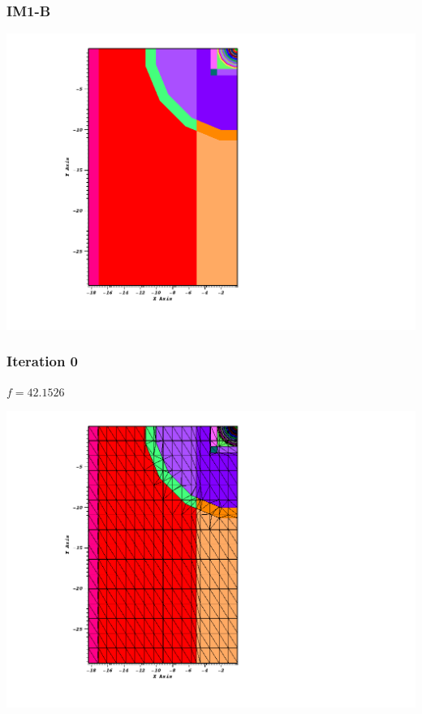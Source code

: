 \documentclass[compress]{beamer}
\begin{document}
\begin{frame}[t]\frametitle{IM1-B}
\centering
\includegraphics[scale = 0.3]{figures/IM1_filled_boundary0000.png}
\end{frame}

\begin{frame}[t]\frametitle{Iteration 0}
\begin{minipage}{0.15\textwidth}
\begin{footnotesize}
$f = 42.1526$
\end{footnotesize}
\end{minipage}
\begin{minipage}{0.8\textwidth}
\centering
\includegraphics[scale=0.3]{figures/IM1_pre_iterations0000.png}
\end{minipage}
\end{frame}
\end{document}
